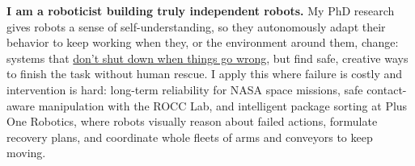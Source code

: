 
\begin{cvparagraph}
  \textbf{I am a roboticist building truly independent robots.} My PhD research gives robots a sense of self-understanding, so they autonomously adapt their behavior to keep working when they, or the environment around them, change: systems that \underline{don't shut down when things go wrong}, but find safe, creative ways to finish the task without human rescue. I apply this where failure is costly and intervention is hard: long-term reliability for NASA space missions, safe contact-aware manipulation with the ROCC Lab, and intelligent package sorting at Plus One Robotics, where robots visually reason about failed actions, formulate recovery plans, and coordinate whole fleets of arms and conveyors to keep moving.
\end{cvparagraph}
